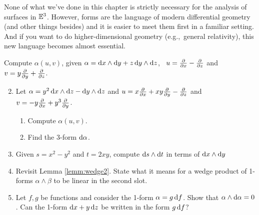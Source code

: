 
None of what we've done in this chapter is strictly necessary for the analysis of surfaces in $\mathbb{E}^3$. However, forms are the language of modern differential geometry (and other things besides) and it is easier to meet them first in a familiar setting. And if you want to do higher-dimensional geometry (e.g.,\ general relativity), this new language becomes almost essential.



\begin{exercises}
	\exstart Compute $\alpha(u,v)$, given $\alpha={\mathrm{d} x}\wedge{\mathrm{d}y}+z\,{\mathrm{d} y}\wedge{\mathrm{d}z}$, \ $u=\frac{\partial }{\partial x}-\frac{\partial }{\partial z}$ and $v=y\frac{\partial }{\partial y}+\frac{\partial }{\partial z}$.\vspace{-3pt}

	\begin{enumerate}\setcounter{enumi}{1}
	  \item Let $\alpha=y^2\,{\mathrm{d} x}\wedge{\mathrm{d}z}-{\mathrm{d} y}\wedge{\mathrm{d}z}$ and $u=x\frac{\partial }{\partial x}+xy\frac{\partial }{\partial y}-\frac{\partial }{\partial z}$ and $v=-y\frac{\partial }{\partial x}+y^3\frac{\partial }{\partial y}$.
		\begin{enumerate}
		  \item Compute $\alpha(u,v)$.
		  \item Find the 3-form $\mathrm{d}\alpha$.
		\end{enumerate}
		
		
		\item Given $s=x^2-y^2$ and $t=2xy$, compute ${\mathrm{d} s}\wedge{\mathrm{d}t}$ in terms of ${\mathrm{d} x}\wedge{\mathrm{d}y}$
		
		
		\item Revisit Lemma \ref{lemm:wedge2}. State what it means for a wedge product of 1-forms $\alpha\wedge\beta$ to be linear in the second slot.
		
		
		\item Let $f,g$ be functions and consider the 1-form $\alpha=g\,{\mathrm{d} f}$. Show that $\alpha\wedge\mathrm{d}\alpha=0$. Can the 1-form ${\mathrm{d} x}+y\,{\mathrm{d} z}$ be written in the form $g\,{\mathrm{d} f}$?
		

\end{enumerate}
\end{exercises}

